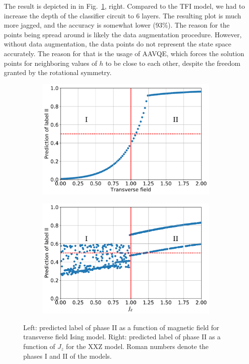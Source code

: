 The result is depicted in in Fig.~\ref{fig:phase_classification}, right. Compared to the TFI model, we had to increase the depth of the classifier circuit to 6 layers. The resulting plot is much more jagged, and the accuracy is somewhat lower (93\%). The reason for the points being spread around is likely the data augmentation procedure. However, without data augmentation, the data points do not represent the state space accurately. The reason for that is the usage of AAVQE, which forces the solution points for neighboring values of $h$ to be close to each other, despite the freedom granted by the rotational symmetry.


\begin{figure}
    \centering
    \begin{subfigure}{.48\linewidth}
        \centering
        \includegraphics[width=\textwidth]{figures/tfi_classification_new_2021}
    \end{subfigure}\begin{subfigure}{.48\linewidth}
        \centering
        \includegraphics[width=\textwidth]{figures/xxz_classification_new_2021.pdf}
    \end{subfigure}
    \caption{Left: predicted label of phase II as a function of magnetic field for transverse field Ising model. Right: predicted label of phase II as a function of $J_z$ for the XXZ model. Roman numbers denote the phases I and II of the models.}
    \label{fig:phase_classification}
\end{figure}

